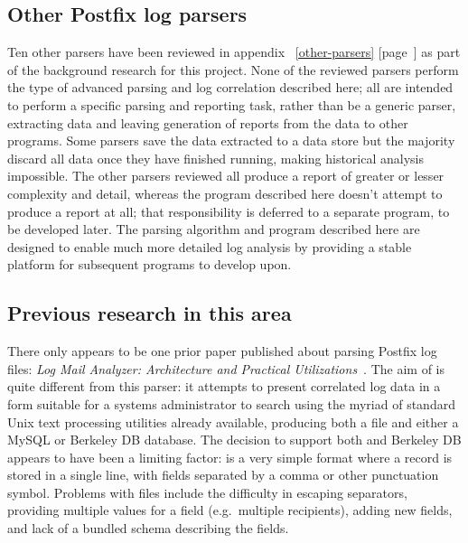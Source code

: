 \documentclass[a4paper,12pt,draft]{article}
\newcommand{\refwithpage}[1]{%
    \empty{}\ref{#1} [page~\pageref{#1}]%
}
\begin{document}
\subsection{Other Postfix log parsers}

Ten other parsers have been reviewed in
appendix~\refwithpage{other-parsers} as part of the background research for
this project.  None of the reviewed parsers perform the type of advanced
parsing and log correlation described here; all are intended to perform a
specific parsing and reporting task, rather than be a generic parser,
extracting data and leaving generation of reports from the data to other
programs.  Some parsers save the data extracted to a data store but the
majority discard all data once they have finished running, making
historical analysis impossible.  The other parsers reviewed all produce a
report of greater or lesser complexity and detail, whereas the program
described here doesn't attempt to produce a report at all; that
responsibility is deferred to a separate program, to be developed later.
The parsing algorithm and program described here are designed to enable
much more detailed log analysis by providing a stable platform for
subsequent programs to develop upon.



\subsection{Previous research in this area}

\label{prior art}

There only appears to be one prior paper published about parsing Postfix
log files: \textit{Log Mail Analyzer: Architecture and Practical
Utilizations\/}~\cite{log-mail-analyser}.  The aim of \LMA{} is quite
different from this parser: it attempts to present correlated log data in a
form suitable for a systems administrator to search using the myriad of
standard Unix text processing utilities already available, producing both a
\CSV{} file and either a MySQL or Berkeley DB database.  The decision to
support both \CSV{} and Berkeley DB appears to have been a limiting factor:
\CSV{} is a very simple format where a record is stored in a single line,
with fields separated by a comma or other punctuation symbol.  Problems
with \CSV{} files include the difficulty in escaping separators, providing
multiple values for a field (e.g.\ multiple recipients), adding new fields,
and lack of a bundled schema describing the fields.
\end{document}
